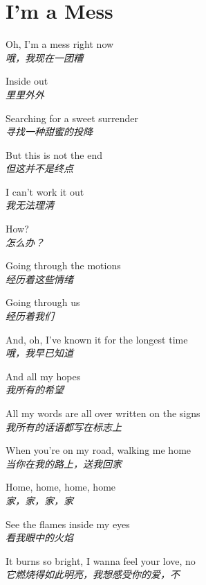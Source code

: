 \section{I'm a Mess}

\thispagestyle{empty}


\begin{spacing}{1.5}
\begin{flushleft}
Oh, I'm a mess right now\\
\textit{哦，我现在一团糟}\lyricspace

Inside out\\
\textit{里里外外}\lyricspace

Searching for a sweet surrender\\
\textit{寻找一种甜蜜的投降}\lyricspace

But this is not the end\\
\textit{但这并不是终点}\lyricspace

I can't work it out\\
\textit{我无法理清}\lyricspace

How?\\
\textit{怎么办？}\lyricspace

Going through the motions\\
\textit{经历着这些情绪}\lyricspace

Going through us\\
\textit{经历着我们}\lyricspace

And, oh, I've known it for the longest time\\
\textit{哦，我早已知道}\lyricspace

And all my hopes\\
\textit{我所有的希望}\lyricspace

All my words are all over written on the signs\\
\textit{我所有的话语都写在标志上}\lyricspace

When you're on my road, walking me home\\
\textit{当你在我的路上，送我回家}\lyricspace

Home, home, home, home\\
\textit{家，家，家，家}\lyricspace

See the flames inside my eyes\\
\textit{看我眼中的火焰}\lyricspace

It burns so bright, I wanna feel your love, no\\
\textit{它燃烧得如此明亮，我想感受你的爱，不}\lyricspace


\end{flushleft}
\end{spacing}
